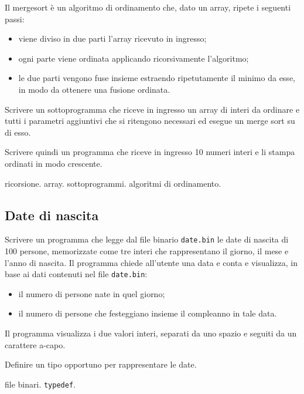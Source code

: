 Il mergesort \`e un algoritmo di ordinamento che, dato un array, ripete i seguenti passi:
\begin{itemize}
    \item viene diviso in due parti l'array ricevuto in ingresso;
    \item ogni parte viene ordinata applicando ricorsivamente l'algoritmo;
    \item le due parti vengono fuse insieme estraendo ripetutamente il minimo da esse, in modo da ottenere una fusione ordinata.
\end{itemize}

Scrivere un sottoprogramma che riceve in ingresso un array di interi da ordinare e tutti i parametri aggiuntivi che si ritengono necessari ed esegue un merge sort su di esso.

Scrivere quindi un programma che riceve in ingresso 10 numeri interi e li stampa ordinati in modo crescente.

\begin{tags}
ricorsione. array. sottoprogrammi. algoritmi di ordinamento.
\end{tags}



\subsection{Date di nascita}

Scrivere un programma che legge dal file binario \texttt{date.bin} le date di nascita di 100 persone, memorizzate come tre interi che rappresentano il giorno, il mese e l'anno di nascita. 
Il programma chiede all'utente una data e conta e visualizza, in base ai dati contenuti nel file \texttt{date.bin}:
\begin{itemize}
    \item il numero di persone nate in quel giorno;
    \item il numero di persone che festeggiano insieme il compleanno in tale data.
\end{itemize}
Il programma visualizza i due valori interi, separati da uno spazio e seguiti da un carattere a-capo.
 
Definire un tipo opportuno per rappresentare le date.

\begin{tags}
file binari. \texttt{typedef}.
\end{tags}



